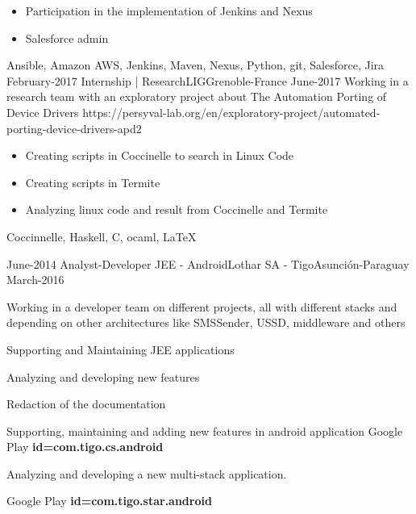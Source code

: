 \begin{experiences}
{\begin{itemize}
                        \item Participation in the implementation of Jenkins and Nexus
                        \item Salesforce admin
                      \end{itemize}}
                    {Ansible, Amazon AWS, Jenkins, Maven, Nexus, Python, git, Salesforce, Jira}
  \emptySeparator
    \projectexperiences
    {February-2017}   {Internship | Research}{LIG}{Grenoble-France}
    {June-2017}
                    {Working in a research team with an exploratory project about The Automation Porting of Device Drivers \tiny{https://persyval-lab.org/en/exploratory-project/automated-porting-device-drivers-apd2}}
                    {
                    \begin{itemize}
                        \item Creating scripts in Coccinelle to search in Linux Code
                        \item Creating scripts in Termite
                        \item Analyzing linux code and result from Coccinelle and Termite
                      \end{itemize}
                     }
                    {Coccinnelle, Haskell, C, ocaml, \LaTeX}
  \emptySeparator

  \projectexperiences
    {June-2014}   {Analyst-Developer JEE - Android}{Lothar SA - Tigo}{Asunción-Paraguay}
    {March-2016} {

                    Working in a developer team on different projects, all with different stacks and depending on other architectures like SMSSender, USSD, middleware and others}
                {

                        \begin{itemize}
                            \item Supporting and Maintaining JEE applications
                            \item Analyzing and developing new features
                            \item Redaction of the documentation
                            \item Supporting, maintaining and adding new features in android application \tiny{Google Play \textbf{id=com.tigo.cs.android}}
                            \normalsize{\item Analyzing and developing a new multi-stack application.} \tiny{Google Play \textbf{id=com.tigo.star.android}}
                      \end{itemize}

}
\end{experiences}
